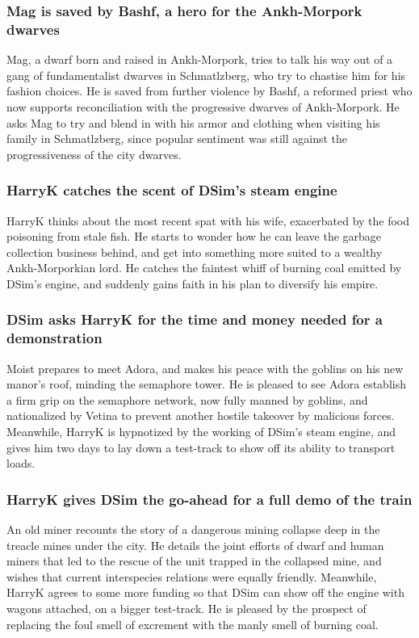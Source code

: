 \subsubsection{\Gls{Mag} is saved by \Gls{Bashf}, a hero for the Ankh-Morpork dwarves}
\Gls{Mag}, a dwarf born and raised in Ankh-Morpork, tries to talk his way out of a gang of
fundamentalist dwarves in Schmatlzberg, who try to chastise him for his fashion choices. He is
saved from further violence by \Gls{Bashf}, a reformed priest who now supports reconciliation with
the progressive dwarves of Ankh-Morpork. He asks \Gls{Mag} to try and blend in with his armor and
clothing when visiting his family in Schmatlzberg, since popular sentiment was still against the
progressiveness of the city dwarves.

\subsubsection{\Gls{HarryK} catches the scent of \Gls{DSim}'s steam engine}
\Gls{HarryK} thinks about the most recent spat with his wife, exacerbated by the food poisoning
from stale fish. He starts to wonder how he can leave the garbage collection business behind, and
get into something more suited to a wealthy Ankh-Morporkian lord. He catches the faintest whiff of
burning coal emitted by \Gls{DSim}'s engine, and suddenly gains faith in his plan to diversify his
empire.

\subsubsection{\Gls{DSim} asks \Gls{HarryK} for the time and money needed for a demonstration}
\Gls{Moist} prepares to meet \Gls{Adora}, and makes his peace with the goblins on his new manor's
roof, minding the semaphore tower. He is pleased to see \Gls{Adora} establish a firm grip on the
semaphore network, now fully manned by goblins, and nationalized by \Gls{Vetina} to prevent another
hostile takeover by malicious forces. Meanwhile, \Gls{HarryK} is hypnotized by the working of
\Gls{DSim}'s steam engine, and gives him two days to lay down a test-track to show off its ability
to transport loads.

\subsubsection{\Gls{HarryK} gives \Gls{DSim} the go-ahead for a full demo of the train}
An old miner recounts the story of a dangerous mining collapse deep in the treacle mines under the
city. He details the joint efforts of dwarf and human miners that led to the rescue of the unit
trapped in the collapsed mine, and wishes that current interspecies relations were equally
friendly. Meanwhile, \Gls{HarryK} agrees to some more funding so that \Gls{DSim} can show off the
engine with wagons attached, on a bigger test-track. He is pleased by the prospect of replacing the
foul smell of excrement with the manly smell of burning coal.

